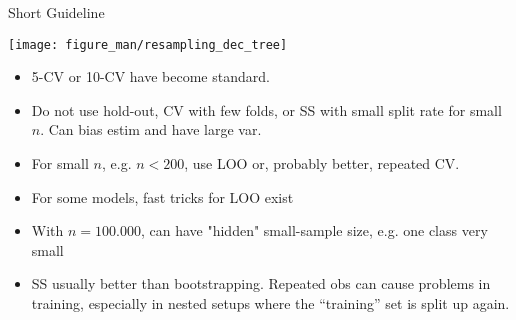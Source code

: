 \documentclass[11pt,compress,t,notes=noshow, xcolor=table]{beamer}
\begin{document}
\begin{vbframe}{Short Guideline}

\fboxsep=0pt
\noindent%
\begin{minipage}[t]{0.42\linewidth}
\vspace{0pt}
\texttt{[image: figure\_man/resampling\_dec\_tree]}
\end{minipage}%
\hfill%
%
\begin{minipage}[t]{0.58\linewidth}
\vspace{0pt}
\footnotesize
\begin{itemize}
  \item 5-CV or 10-CV have become standard.
  \item Do not use hold-out, CV with few folds, or SS with small 
  split rate for small $n$. Can bias estim and have large var.
  \item For small $n$, e.g. $n < 200$, use 
  LOO or, probably better, repeated CV.
  \item For some models, fast tricks for LOO exist
  \item With $n = 100.000$, can have "hidden" small-sample size, e.g.
  one class very small
  \item SS usually better than bootstrapping. Repeated obs can cause problems in training,
    especially in nested setups where the \enquote{training} set is split up again.
\end{itemize}
\end{minipage}



\end{vbframe}

\endlecture
\end{document}
